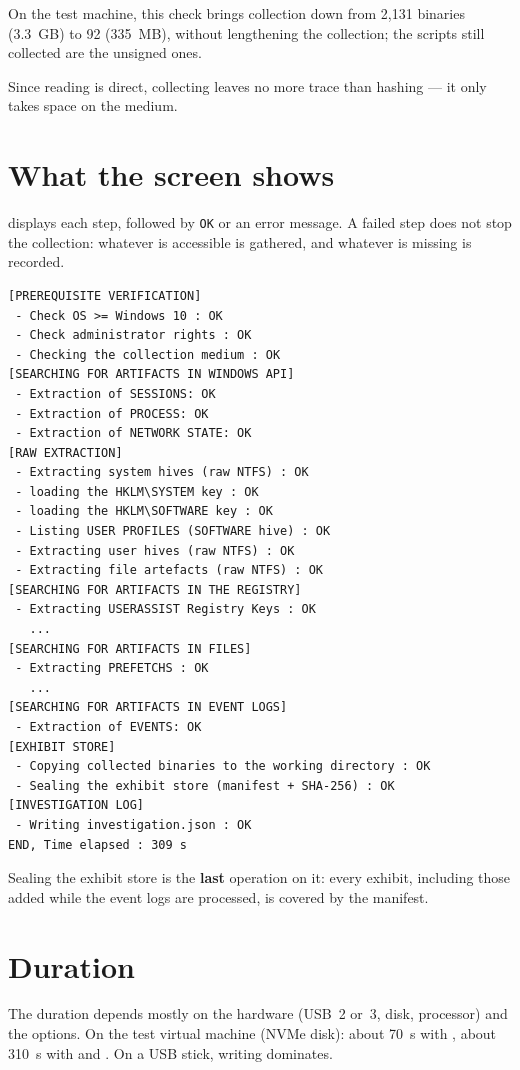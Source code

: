 \documentclass[11pt,a4paper,oneside]{report}
\begin{document}
On the test machine, this check brings collection down from 2,131 binaries
(3.3~GB) to 92 (335~MB), without lengthening the collection; the scripts still
collected are the unsigned ones.

Since reading is direct, collecting leaves no more trace than hashing — it only
takes space on the medium.

\section{What the screen shows}

\wac{} displays each step, followed by \texttt{OK} or an error message. A failed
step does not stop the collection: whatever is accessible is gathered, and
whatever is missing is recorded.

\begin{lstlisting}
[PREREQUISITE VERIFICATION]
 - Check OS >= Windows 10 : OK
 - Check administrator rights : OK
 - Checking the collection medium : OK
[SEARCHING FOR ARTIFACTS IN WINDOWS API]
 - Extraction of SESSIONS: OK
 - Extraction of PROCESS: OK
 - Extraction of NETWORK STATE: OK
[RAW EXTRACTION]
 - Extracting system hives (raw NTFS) : OK
 - loading the HKLM\SYSTEM key : OK
 - loading the HKLM\SOFTWARE key : OK
 - Listing USER PROFILES (SOFTWARE hive) : OK
 - Extracting user hives (raw NTFS) : OK
 - Extracting file artefacts (raw NTFS) : OK
[SEARCHING FOR ARTIFACTS IN THE REGISTRY]
 - Extracting USERASSIST Registry Keys : OK
   ...
[SEARCHING FOR ARTIFACTS IN FILES]
 - Extracting PREFETCHS : OK
   ...
[SEARCHING FOR ARTIFACTS IN EVENT LOGS]
 - Extraction of EVENTS: OK
[EXHIBIT STORE]
 - Copying collected binaries to the working directory : OK
 - Sealing the exhibit store (manifest + SHA-256) : OK
[INVESTIGATION LOG]
 - Writing investigation.json : OK
END, Time elapsed : 309 s
\end{lstlisting}

Sealing the exhibit store is the \textbf{last} operation on it: every exhibit,
including those added while the event logs are processed, is covered by the
manifest.

\section{Duration}

The duration depends mostly on the hardware (USB~2 or~3, disk, processor) and
the options. On the test virtual machine (NVMe disk): about 70~s with
, about 310~s with  and . On a USB stick,
writing dominates.
\end{document}
